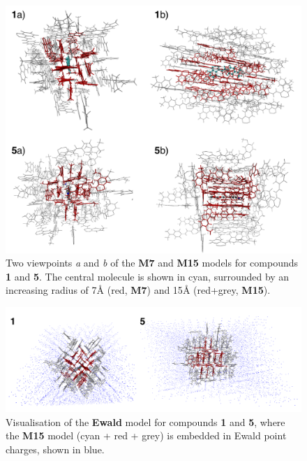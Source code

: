 \begin{figure}
\centering
  \includegraphics[width=0.8\linewidth]{4IntraInterInteractions/HC_Cluster_Models.pdf}
  \caption[The \textbf{M7} and \textbf{M15} cluster models]{Two viewpoints \textit{a} and \textit{b} of the \textbf{M7} and \textbf{M15} models for compounds \textbf{1} and \textbf{5}. The central molecule is shown in cyan, surrounded by an increasing radius of 7{\AA} (red, \textbf{M7}) and 15{\AA} (red+grey, \textbf{M15}).}
  \label{figure: HC_Cluster_Models}
\end{figure}

\begin{figure}
\centering
  \includegraphics[width=0.9\linewidth]{4IntraInterInteractions/HC_Ewald.pdf}
  \caption[The \textbf{Ewald} charges of \textbf{M15}]{Visualisation of the \textbf{Ewald} model for compounds \textbf{1} and \textbf{5}, where the \textbf{M15} model (cyan + red + grey) is embedded in Ewald point charges, shown in blue.}
  \label{figure: HC_Ewald}
\end{figure}

